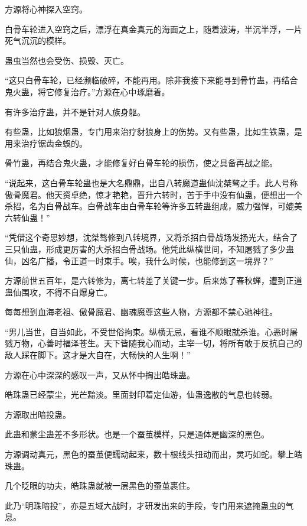
\begin{this_body}

方源将心神探入空窍。

白骨车轮进入空窍之后，漂浮在真金真元的海面之上，随着波涛，半沉半浮，一片死气沉沉的模样。

蛊虫当然也会受伤、损毁、灭亡。

“这只白骨车轮，已经濒临破碎，不能再用。除非我接下来能寻到骨竹蛊，再结合鬼火蛊，将它修复治疗。”方源在心中琢磨着。

有许多治疗蛊，并不是针对人族身躯。

有些蛊，比如狼烟蛊，专门用来治疗豺狼身上的伤势。又有些蛊，比如生铁蛊，是用来治疗锯齿金蜈的。

骨竹蛊，再结合鬼火蛊，才能修复好白骨车轮的损伤，使之具备再战之能。

“说起来，这白骨车轮蛊也是大名鼎鼎，出自八转魔道蛊仙沈桀骜之手。此人号称傲骨魔君。他天资卓绝，惊才艳艳，晋升六转时，苦于手中没有仙蛊，便想出一个杀招，名为白骨战车。白骨战车由白骨车轮等许多五转蛊组成，威力强悍，可媲美六转仙蛊！”

“凭借这个奇思妙想，沈桀骜修到八转境界，又将杀招白骨战场发扬光大，结合了三只仙蛊，形成更厉害的大杀招白骨战场。他凭此纵横世间，不知屠戮了多少蛊仙，凶名广播，令正道一时束手。唉，我什么时候，也能修到这一境界？”

方源前世五百年，是六转修为，离七转差了关键一步。后来炼了春秋蝉，遭到正道蛊仙围攻，不得不自爆身亡。

每每想到血海老祖、傲骨魔君、幽魂魔尊这些人物，方源都不禁心驰神往。

“男儿当世，自当如此，不受世俗拘束。纵横无忌，看谁不顺眼就杀谁。心恶时屠戮万物，心善时福泽苍生。天下皆随我心而动，主宰一切，将所有敢于反抗自己的敌人踩在脚下。这才是大自在，大畅快的人生啊！”

方源在心中深深的感叹一声，又从怀中掏出皓珠蛊。

皓珠蛊已经蒙尘，光芒黯淡。里面封印着定仙游，仙蛊逸散的气息也转弱。

方源取出暗投蛊。

此蛊和蒙尘蛊差不多形状。也是一个蚕茧模样，只是通体是幽深的黑色。

方源调动真元，黑色的蚕茧便蠕动起来，数十根线头扭动而出，灵巧如蛇。攀上皓珠蛊。

几个眨眼的功夫，皓珠蛊就被一层黑色的蚕茧裹住。

此乃“明珠暗投”，亦是五域大战时，才研发出来的手段，专门用来遮掩蛊虫的气息。


\end{this_body}
